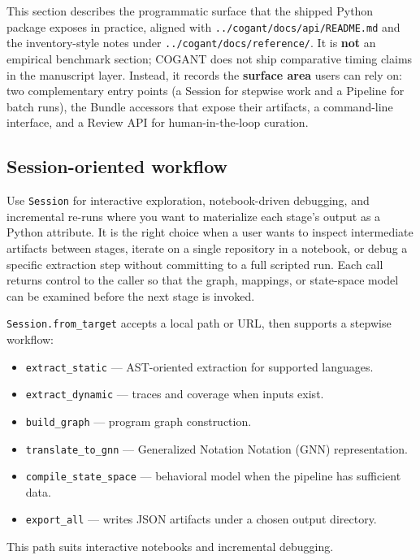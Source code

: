 \documentclass[
]{article}
\providecommand{\tightlist}{%
  \setlength{\itemsep}{0pt}\setlength{\parskip}{0pt}}
\begin{document}
This section describes the programmatic surface that the shipped Python
package exposes in practice, aligned with
\texttt{../cogant/docs/api/README.md} and the inventory-style notes
under \texttt{../cogant/docs/reference/}. It is \textbf{not} an
empirical benchmark section; COGANT does not ship comparative timing
claims in the manuscript layer. Instead, it records the \textbf{surface
area} users can rely on: two complementary entry points (a Session for
stepwise work and a Pipeline for batch runs), the Bundle accessors that
expose their artifacts, a command-line interface, and a Review API for
human-in-the-loop curation.

\subsection{Session-oriented workflow}\label{session-oriented-workflow}

Use \texttt{Session} for interactive exploration, notebook-driven
debugging, and incremental re-runs where you want to materialize each
stage's output as a Python attribute. It is the right choice when a user
wants to inspect intermediate artifacts between stages, iterate on a
single repository in a notebook, or debug a specific extraction step
without committing to a full scripted run. Each call returns control to
the caller so that the graph, mappings, or state-space model can be
examined before the next stage is invoked.

\texttt{Session.from\_target} accepts a local path or URL, then supports
a stepwise workflow:

\begin{itemize}
\tightlist
\item
  \texttt{extract\_static} --- AST-oriented extraction for supported
  languages.
\item
  \texttt{extract\_dynamic} --- traces and coverage when inputs exist.
\item
  \texttt{build\_graph} --- program graph construction.
\item
  \texttt{translate\_to\_gnn} --- Generalized Notation Notation (GNN)
  representation.
\item
  \texttt{compile\_state\_space} --- behavioral model when the pipeline
  has sufficient data.
\item
  \texttt{export\_all} --- writes JSON artifacts under a chosen output
  directory.
\end{itemize}

This path suits interactive notebooks and incremental debugging.
\end{document}
